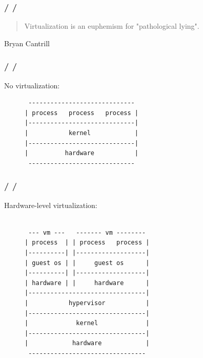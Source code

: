 \documentclass{beamer}
\newcommand{\autotitle}
{\frametitle{
    \secname
    \ifx\insertsubsection\empty
    \else
        /\subsecname
        \ifx\insertsubsubsection\empty\else/\subsubsecname\fi
    \fi}}
\begin{document}
\begin{frame}
    \autotitle
    \begin{quote}
        Virtualization is an euphemism for "pathological lying".
    \end{quote}
    Bryan Cantrill
\end{frame}

\begin{frame}[fragile]
    \autotitle
    No virtualization:
    \begin{figure}
        \centering
        \begin{varwidth}{\linewidth}
            \begin{verbatim}
 -----------------------------
| process   process   process |
|-----------------------------|
|           kernel            |
|-----------------------------|
|          hardware           |
 -----------------------------
            \end{verbatim}
        \end{varwidth}
    \end{figure}
\end{frame}

\begin{frame}[fragile]
    \autotitle
    Hardware-level virtualization:
    \begin{figure}
        \centering
        \begin{varwidth}{\linewidth}
            \begin{verbatim}

 --- vm ---   ------- vm --------
| process  | | process   process |
|----------| |-------------------|
| guest os | |     guest os      |
|----------| |-------------------|
| hardware | |     hardware      |
|--------------------------------|
|           hypervisor           |
|--------------------------------|
|             kernel             |
|--------------------------------|
|            hardware            |
 --------------------------------
            \end{verbatim}
        \end{varwidth}
    \end{figure}
\end{frame}
\end{document}
